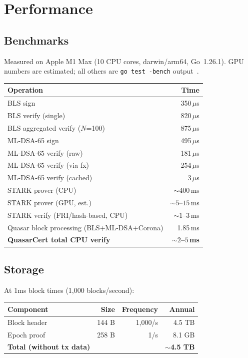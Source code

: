 \section{Performance}


\subsection{Benchmarks}

Measured on Apple M1 Max (10 CPU cores, darwin/arm64, Go~1.26.1).
GPU numbers are estimated; all others are \texttt{go~test~-bench} output~\cite{lux-benchmarks}.

\begin{center}
\begin{tabular}{lr}
\toprule
\textbf{Operation} & \textbf{Time} \\
\midrule
BLS sign & 350\,$\mu$s \\
BLS verify (single) & 820\,$\mu$s \\
BLS aggregated verify ($N$=100) & 875\,$\mu$s \\
ML-DSA-65 sign & 495\,$\mu$s \\
ML-DSA-65 verify (raw) & 181\,$\mu$s \\
ML-DSA-65 verify (via fx) & 254\,$\mu$s \\
ML-DSA-65 verify (cached) & 3\,$\mu$s \\
STARK prover (CPU) & ${\sim}400$\,ms \\
STARK prover (GPU, est.) & ${\sim}5$--$15$\,ms \\
STARK verify (FRI/hash-based, CPU) & ${\sim}1$--$3$\,ms \\
Quasar block processing (BLS+ML-DSA+Corona) & 1.85\,ms \\
\textbf{QuasarCert total CPU verify} & \textbf{${\sim}2$--$5$\,ms} \\
\bottomrule
\end{tabular}
\end{center}

\subsection{Storage}

At 1ms block times (1,000 blocks/second):

\begin{center}
\begin{tabular}{lrrr}
\toprule
\textbf{Component} & \textbf{Size} & \textbf{Frequency} & \textbf{Annual} \\
\midrule
Block header & 144 B & 1,000/s & 4.5 TB \\
Epoch proof & 258 B & 1/s & 8.1 GB \\
\midrule
\textbf{Total (without tx data)} & & & \textbf{$\sim$4.5 TB} \\
\bottomrule
\end{tabular}
\end{center}

